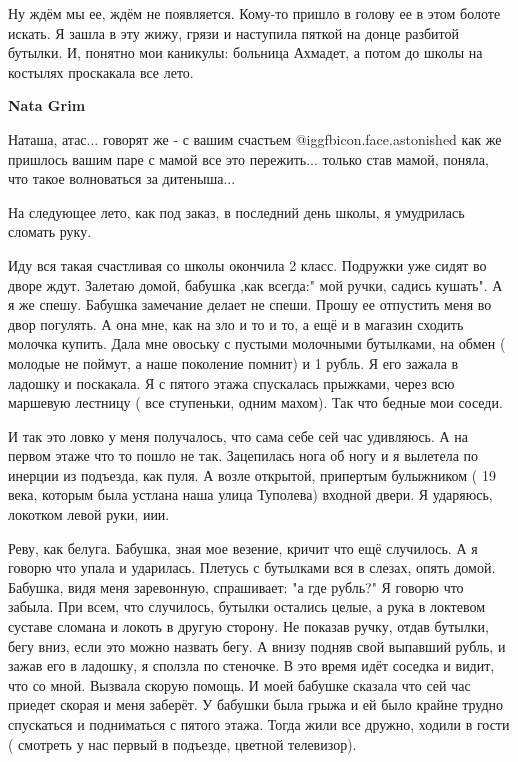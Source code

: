 \begin{itemize}
\begin{itemize}
\begin{itemize}
Ну ждём мы ее, ждём не появляется. Кому-то пришло в голову ее в этом болоте
искать. Я зашла в эту жижу, грязи и наступила пяткой на донце разбитой бутылки.
И, понятно мои каникулы: больница Ахмадет, а потом до школы на костылях
проскакала все лето.

\end{itemize} %

\textbf{Nata Grim}

Наташа, атас... говорят же - с вашим счастьем @igg{fbicon.face.astonished}  как же пришлось вашим паре с
мамой все это пережить... только став мамой, поняла, что такое волноваться за
дитеныша...


На следующее лето, как под заказ, в последний день школы, я умудрилась сломать
руку.

Иду вся такая счастливая со школы окончила 2 класс. Подружки уже сидят во дворе
ждут. Залетаю домой, бабушка ,как всегда:" мой ручки, садись кушать". А я же
спешу. Бабушка замечание делает не спеши. Прошу ее отпустить меня во двор
погулять. А она мне, как на зло и то и то, а ещё и в магазин сходить молочка
купить. Дала мне овоську с пустыми молочными бутылками, на обмен ( молодые не
поймут, а наше поколение помнит) и 1 рубль. Я его зажала в ладошку и поскакала.
Я с пятого этажа спускалась прыжками, через всю маршевую лестницу ( все
ступеньки, одним махом). Так что бедные мои соседи.

И так это ловко у меня получалось, что сама себе сей час удивляюсь. А на первом
этаже что то пошло не так. Зацепилась нога об ногу и я вылетела по инерции из
подъезда, как пуля. А возле открытой, припертым булыжником ( 19 века, которым
была устлана наша улица Туполева) входной двери. Я ударяюсь, локотком левой
руки, иии.

Реву, как белуга. Бабушка, зная мое везение, кричит что ещё случилось. А я
говорю что упала и ударилась. Плетусь с бутылками вся в слезах, опять домой.
Бабушка, видя меня заревонную, спрашивает: "а где рубль?" Я говорю что забыла.
При всем, что случилось, бутылки остались целые, а рука в локтевом суставе
сломана и локоть в другую сторону. Не показав ручку, отдав бутылки, бегу вниз,
если это можно назвать бегу. А внизу подняв свой выпавший рубль, и зажав его в
ладошку, я сползла по стеночке. В это время идёт соседка и видит, что со мной.
Вызвала скорую помощь. И моей бабушке сказала что сей час приедет скорая и меня
заберёт. У бабушки была грыжа и ей было крайне трудно спускаться и подниматься
с пятого этажа. Тогда жили все дружно, ходили в гости ( смотреть у нас первый в
подъезде, цветной телевизор).


\end{itemize}
\end{itemize}
